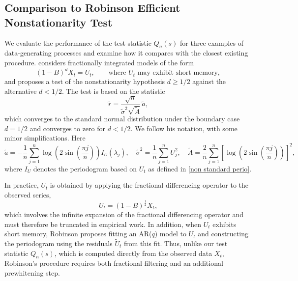 \documentclass[12pt]{article}
\numberwithin{equation}{section}
\begin{document}
\subsection{Comparison to Robinson Efficient Nonstationarity Test}\label{Robinson method}

We evaluate the performance of the test statistic $Q_n(s)$ for three examples of data-generating processes and examine how it compares with the closest existing procedure.
\cite{Robinson, Robinson2003} considers fractionally integrated models of the form
\[
(1-B)^dX_t=U_t,
\qquad \text{where } U_t \text{ may exhibit short memory},
\]
and proposes a test of the nonstationarity hypothesis \(d\ge 1/2\) against the alternative \(d<1/2\). The test is based on the statistic
\[
\tilde r=\frac{\sqrt{n}}{\tilde\sigma^2\sqrt{\tilde A}}\,\tilde a,
\]
which converges to the standard normal distribution under the boundary case \(d=1/2\) and converges to zero for $d<1/2$. We follow his notation, with some minor simplifications. Here
\[
\tilde a=-\frac{1}{n}\sum_{j=1}^n 
\log\!\left(2\sin\!\left(\frac{\pi j}{n}\right)\right)
I_U(\lambda_j),\quad
\tilde\sigma^2=\frac{1}{n}\sum_{j=1}^nU^2_j,
\quad
\tilde A=\frac{2}{n}\sum_{j=1}^n
\left[
\log\!\left(2\sin\!\left(\frac{\pi j}{n}\right)\right)
\right]^2,
\]
where \(I_U\) denotes the periodogram based on \(U_t\) as defined in \eqref{non standard perio}.

In practice, \(U_t\) is obtained by applying the fractional differencing operator to the observed series,
\[
U_t=(1-B)^\frac{1}{2}X_t,
\]
which involves the infinite expansion of the fractional differencing operator and must therefore be truncated in empirical work. In addition, when \(U_t\) exhibits short memory, Robinson proposes fitting an AR(\(q\)) model to \(U_t\) and constructing the periodogram using the residuals \(\tilde U_t\) from this fit. Thus, unlike our test statistic \(Q_n(s)\), which is computed directly from the observed data \(X_t\), Robinson's procedure requires both fractional filtering and an additional prewhitening step.
\end{document}

